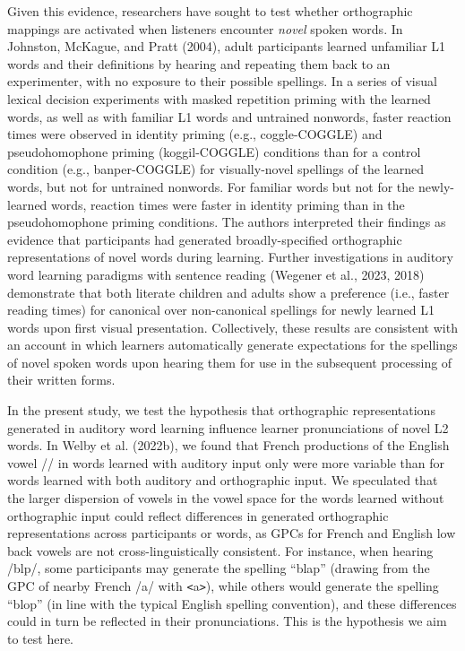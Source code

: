 \documentclass[
  english,
  man,floatsintext]{apa7}
\begin{document}
Given this evidence, researchers have sought to test whether orthographic mappings are activated when listeners encounter \emph{novel} spoken words. In Johnston, McKague, and Pratt (2004), adult participants learned unfamiliar L1 words and their definitions by hearing and repeating them back to an experimenter, with no exposure to their possible spellings. In a series of visual lexical decision experiments with masked repetition priming with the learned words, as well as with familiar L1 words and untrained nonwords, faster reaction times were observed in identity priming (e.g., coggle-COGGLE) and pseudohomophone priming (koggil-COGGLE) conditions than for a control condition (e.g., banper-COGGLE) for visually-novel spellings of the learned words, but not for untrained nonwords. For familiar words but not for the newly-learned words, reaction times were faster in identity priming than in the pseudohomophone priming conditions. The authors interpreted their findings as evidence that participants had generated broadly-specified orthographic representations of novel words during learning. Further investigations in auditory word learning paradigms with sentence reading (Wegener et al., 2023, 2018) demonstrate that both literate children and adults show a preference (i.e., faster reading times) for canonical over non-canonical spellings for newly learned L1 words upon first visual presentation. Collectively, these results are consistent with an account in which learners automatically generate expectations for the spellings of novel spoken words upon hearing them for use in the subsequent processing of their written forms.

In the present study, we test the hypothesis that orthographic representations generated in auditory word learning influence learner pronunciations of novel L2 words. In Welby et al. (2022b), we found that French productions of the English vowel /\textscripta / in words learned with auditory input only were more variable than for words learned with both auditory and orthographic input. We speculated that the larger dispersion of vowels in the vowel space for the words learned without orthographic input could reflect differences in generated orthographic representations across participants or words, as GPCs for French and English low back vowels are not cross-linguistically consistent. For instance, when hearing /bl\textscripta p/, some participants may generate the spelling ``blap'' (drawing from the GPC of nearby French /a/ with \texttt{\textless{}}a\texttt{\textgreater{}}), while others would generate the spelling ``blop'' (in line with the typical English spelling convention), and these differences could in turn be reflected in their pronunciations. This is the hypothesis we aim to test here.
\end{document}
